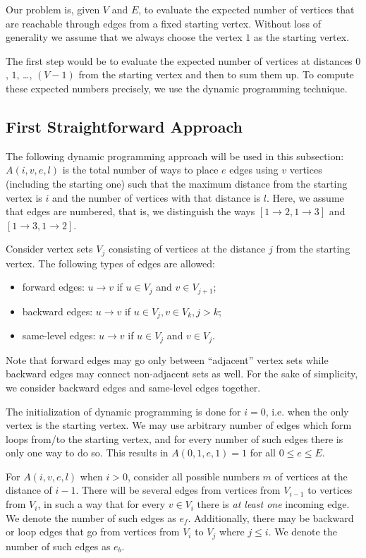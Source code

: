 \documentclass{llncs}
\begin{document}
  Our problem is, given $V$ and $E$, to evaluate the expected number of vertices that are reachable 
  through edges from a fixed starting vertex. 
  Without loss of generality we assume that we always choose the vertex $1$ as the starting vertex.
  
  The first step would be to evaluate the expected number of vertices 
  at distances $0$, $1$, \ldots, $(V - 1)$ 
  from the starting vertex and then to sum them up. To compute these expected numbers precisely,
  we use the dynamic programming technique.
  
  \subsection{First Straightforward Approach}
  
  The following dynamic programming approach will be used in this subsection:
  $A(i,v,e,l)$ is the total number of ways to place $e$ edges using $v$ vertices (including the 
  starting one) such that the maximum distance from the starting vertex is $i$ and the number of
  vertices with that distance is $l$. Here, we assume that edges are numbered, that is, we 
  distinguish the ways $[1 \to 2, 1 \to 3]$ and $[1 \to 3, 1 \to 2]$.
  
  Consider vertex sets $V_j$ consisting of vertices at the distance $j$ from the starting vertex.
  The following types of edges are allowed:
  \begin{itemize}
      \item forward edges: $u \to v$ if $u \in V_j$ and $v \in V_{j+1}$;
      \item backward edges: $u \to v$ if $u \in V_j, v \in V_k, j > k$;
      \item same-level edges: $u \to v$ if $u \in V_j$ and $v \in V_j$.
  \end{itemize}
  
  Note that forward edges may go only between ``adjacent'' vertex sets while backward edges may 
  connect non-adjacent sets as well. For the sake of simplicity, we consider backward edges and 
  same-level edges together.
  
  The initialization of dynamic programming is done for $i = 0$, i.e. when the only vertex is the 
  starting vertex. We may use arbitrary number of edges which form loops from/to the starting 
  vertex, and for every number of such edges there is only one way to do so. This results in 
  $A(0,1,e,1) = 1$ for all $0 \le e \le E$.
  
  For $A(i,v,e,l)$ when $i > 0$, consider all possible numbers $m$ of vertices at the distance of $i - 1$.
  There will be several edges from vertices from $V_{i-1}$ to vertices from $V_{i}$, in such a way that for every $v 
  \in V_{i}$ there is \emph{at least one} incoming edge. We denote the number of such edges as $e_f$.
  Additionally, there may be backward or loop edges that go from vertices from $V_i$ to $V_j$ where $j \le i$.
  We denote the number of such edges as $e_b$.
  
\end{document}
